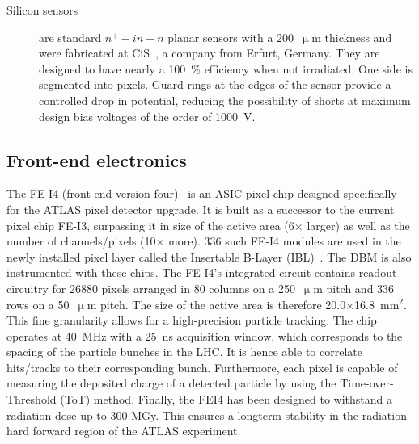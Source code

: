 \begin{description}
\begin{figure}[!t]
\label{fig:wafer}
\end{figure}
\item[Silicon sensors] are standard $n^+ - in - n$ planar sensors with a 200~$\upmu$m thickness and were fabricated at CiS~\cite{}, a company from Erfurt, Germany. They are designed to have nearly a 100~\% efficiency when not irradiated. 
One side is segmented into pixels. Guard rings at the edges of the sensor provide a controlled drop in potential, reducing the possibility of shorts at maximum design bias voltages of the order of 1000~V.
\end{description}



\subsection{Front-end electronics}
The FE-I4 (front-end version four)~\cite{} is an ASIC pixel chip designed specifically for the ATLAS pixel detector upgrade. It is built as a successor to the current pixel chip FE-I3, surpassing it in size of the active area (6$\times$ larger) as well as the number of channels/pixels (10$\times$ more). 336 such FE-I4 modules are used in the newly installed pixel layer called the Insertable B-Layer (IBL)~\cite{}. The DBM is also instrumented with these chips. The FE-I4's integrated circuit contains readout circuitry for 26880 pixels arranged in 80 columns on a 250~$\upmu$m pitch and 336 rows on a 50~$\upmu$m pitch. The size of the active area is therefore 20.0$\times$16.8~mm$^2$. This fine granularity allows for a high-precision particle tracking. The chip operates at 40~MHz with a 25~ns acquisition window, which corresponds to the spacing of the particle bunches in the LHC. It is hence able to correlate hits/tracks to their corresponding bunch. Furthermore, each pixel is capable of measuring the deposited charge of a detected particle by using the Time-over-Threshold (ToT) method. Finally, the FEI4 has been designed to withstand a radiation dose up to 300 MGy. This ensures a longterm stability in the radiation hard forward region of the ATLAS experiment.

